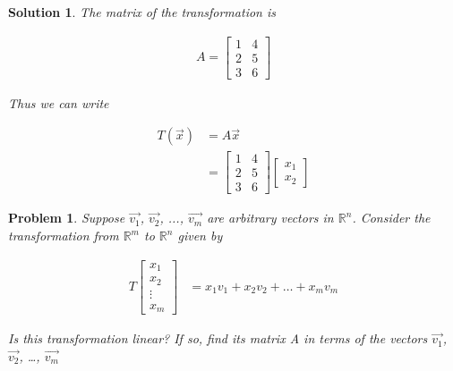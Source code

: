 \documentclass{article}
\newtheorem{problem}{Problem}
\newtheorem*{solution}{Solution}
\begin{document}
\begin{solution}
The matrix of the transformation is 

\begin{align*}
A = \begin{bmatrix} 1 & 4 \\ 2 & 5 \\ 3 & 6 \end{bmatrix}
\end{align*}

Thus we can write

\begin{align*}
T(\vec{x}) &= A\vec{x} \\
&= \begin{bmatrix} 1 & 4 \\ 2 & 5 \\ 3 & 6 \end{bmatrix} \begin{bmatrix} x_{1} \\ x_{2} \end{bmatrix}
\end{align*}
\end{solution}

\begin{problem}
Suppose $\vec{v_{1}}$, $\vec{v_{2}}$, ..., $\vec{v_{m}}$ are arbitrary vectors in $\mathbb{R}^n$. Consider the transformation from $\mathbb{R}^m$ to $\mathbb{R}^n$ given by

\begin{align*}
T \begin{bmatrix} x_{1} \\ x_{2} \\ \vdots \\ x_{m} \end{bmatrix} &= x_{1} v_{1} + x_{2} v_{2} + \dots + x_{m} v_{m} 
\end{align*}

Is this transformation linear? If so, find its matrix A in terms of the vectors $\vec{v_{1}}$, $\vec{v_{2}}$, \dots, $\vec{v_{m}}$

\end{problem}
\end{document}
